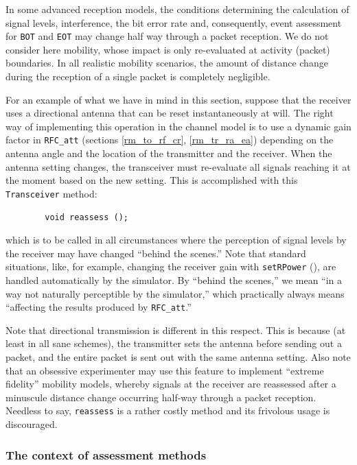 In some advanced reception models,
the conditions determining the calculation of
signal levels, interference, the bit error rate and, consequently,
event assessment for {\tt BOT} and {\tt EOT} may change half way through
a packet reception.
We do not consider here mobility, whose impact is only re-evaluated at
activity (packet) boundaries.
In all realistic mobility scenarios, the amount of distance change during
the reception of a single packet is completely negligible.

For an example of what we have in mind in this section,
suppose that the receiver uses a
directional antenna that can be reset instantaneously at will.
The right way of implementing this operation in the channel model is to
use a dynamic gain factor in
{\tt RFC\_att} (sections \ref{rm_to_rf_cr}, \ref{rm_tr_ra_ea}) 
depending on the antenna angle and the location of the transmitter and the
receiver.
When the antenna setting changes, the transceiver must re-evaluate all
signals reaching it at the moment based on the new setting.
This is accomplished with this {\tt Transceiver} method:
\begin{verbatim}
        void reassess ();
\end{verbatim}
which is
to be called in all circumstances where the perception of signal levels by
the receiver may have changed ``behind the scenes.''
Note that standard situations, like, for example, changing the receiver
gain with {\tt setRPower} (), are handled automatically
by the simulator.
By ``behind the scenes,'' we mean ``in a way not naturally perceptible by the
simulator,'' which practically always means ``affecting the results
produced by {\tt RFC\_att}.''

Note that directional transmission is different in this respect.
This is because (at least in all sane schemes), the transmitter sets the
antenna before sending out a packet, and the entire packet is sent out with
the same antenna setting.
Also note that an obsessive experimenter may use this feature to implement
``extreme fidelity'' mobility models, whereby signals at the receiver are
reassessed after a minuscule distance change occurring half-way through a packet
reception.
Needless to say, {\tt reassess} is a rather costly method and its
frivolous usage is discouraged.

\subsubsection{The context of assessment methods}
\label{rm_tr_ra_cn}

